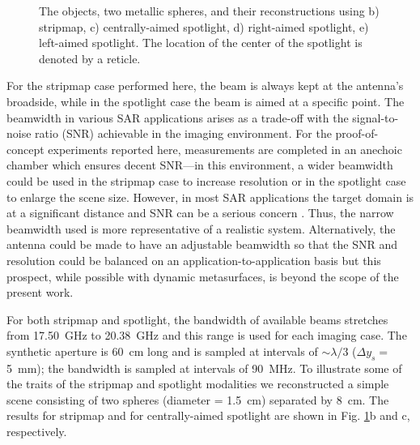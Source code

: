 \documentclass[journal]{IEEEtran}
\begin{document}
\begin{figure}
	\centering
	\caption{\label{fig:f5}The objects, two metallic spheres, and their reconstructions using b) stripmap, c) centrally-aimed spotlight, d) right-aimed spotlight, e) left-aimed spotlight. The location of the center of the spotlight is denoted by a reticle.}
\end{figure}

For the stripmap case performed here, the beam is always kept at the antenna's broadside, while in the spotlight case the beam is aimed at a specific point. The beamwidth in various SAR applications arises as a trade-off with the signal-to-noise ratio (SNR) achievable in the imaging environment. For the proof-of-concept experiments reported here, measurements are completed in an anechoic chamber which ensures decent SNR---in this environment, a wider beamwidth could be used in the stripmap case to increase resolution or in the spotlight case to enlarge the scene size. However, in most SAR applications the target domain is at a significant distance and SNR can be a serious concern \cite{brown1969SARintroduction}. Thus, the narrow beamwidth used is more representative of a realistic system. Alternatively, the antenna could be made to have an adjustable beamwidth so that the SNR and resolution could be balanced on an application-to-application basis but this prospect, while possible with dynamic metasurfaces, is beyond the scope of the present work. 

For both stripmap and spotlight, the bandwidth of available beams stretches from \SI{17.50}{\giga\hertz} to \SI{20.38}{\giga\hertz} and this range is used for each imaging case. The synthetic aperture is \SI{60}{\centi\meter} long and is sampled at intervals of ${\sim}\lambda/3$ ($\Delta y_s =$ \SI{5}{\milli\meter}); the bandwidth is sampled at intervals of \SI{90}{\mega\hertz}. To illustrate some of the traits of the stripmap and spotlight modalities we reconstructed a simple scene consisting of two spheres (diameter = \SI{1.5}{\centi\meter}) separated by \SI{8}{\centi\meter}. The results for stripmap and for centrally-aimed spotlight are shown in Fig. \ref{fig:f5}b and c, respectively.
\end{document}
